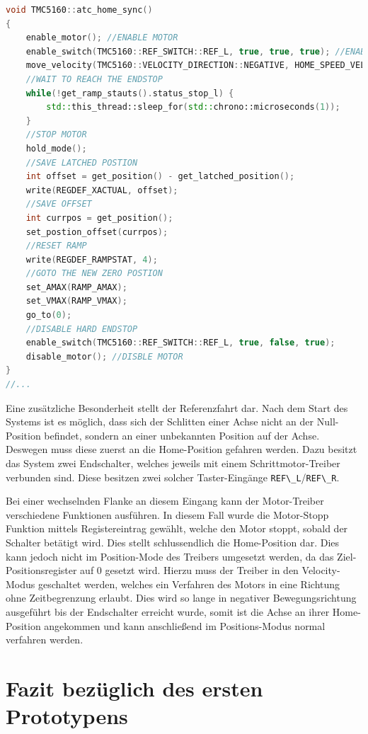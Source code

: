 \begin{lstlisting}[language={C++}]
void TMC5160::atc_home_sync()
{    
    enable_motor(); //ENABLE MOTOR
    enable_switch(TMC5160::REF_SWITCH::REF_L, true, true, true); //ENABLE LIMIT SWICHT => ENABLE HARD ENDSTOP
    move_velocity(TMC5160::VELOCITY_DIRECTION::NEGATIVE, HOME_SPEED_VELOCITY, 1000);  //MOVE NEGATIVE TO LIMIT SWITCH
    //WAIT TO REACH THE ENDSTOP
    while(!get_ramp_stauts().status_stop_l) {
        std::this_thread::sleep_for(std::chrono::microseconds(1));        
    }
    //STOP MOTOR
    hold_mode();
    //SAVE LATCHED POSTION
    int offset = get_position() - get_latched_position();
    write(REGDEF_XACTUAL, offset);
    //SAVE OFFSET
    int currpos = get_position();
    set_postion_offset(currpos);
    //RESET RAMP
    write(REGDEF_RAMPSTAT, 4);
    //GOTO THE NEW ZERO POSTION
    set_AMAX(RAMP_AMAX);
    set_VMAX(RAMP_VMAX);
    go_to(0);
    //DISABLE HARD ENDSTOP 
    enable_switch(TMC5160::REF_SWITCH::REF_L, true, false, true);
    disable_motor(); //DISBLE MOTOR
}
//...
\end{lstlisting}

Eine zusätzliche Besonderheit stellt der Referenzfahrt dar. Nach dem
Start des Systems ist es möglich, dass sich der Schlitten einer Achse
nicht an der Null-Position befindet, sondern an einer unbekannten
Position auf der Achse. Deswegen muss diese zuerst an die Home-Position
gefahren werden. Dazu besitzt das System zwei Endschalter, welches
jeweils mit einem Schrittmotor-Treiber verbunden sind. Diese besitzen
zwei solcher Taster-Eingänge
\passthrough{\lstinline!REF\_L!}/\passthrough{\lstinline!REF\_R!}.

Bei einer wechselnden Flanke an diesem Eingang kann der Motor-Treiber
verschiedene Funktionen ausführen. In diesem Fall wurde die Motor-Stopp
Funktion mittels Registereintrag gewählt, welche den Motor stoppt,
sobald der Schalter betätigt wird. Dies stellt schlussendlich die
Home-Position dar. Dies kann jedoch nicht im Position-Mode des Treibers
umgesetzt werden, da das Ziel-Positionsregister auf 0 gesetzt wird.
Hierzu muss der Treiber in den Velocity-Modus geschaltet werden, welches
ein Verfahren des Motors in eine Richtung ohne Zeitbegrenzung erlaubt.
Dies wird so lange in negativer Bewegungsrichtung ausgeführt bis der
Endschalter erreicht wurde, somit ist die Achse an ihrer Home-Position
angekommen und kann anschließend im Positions-Modus normal verfahren
werden.

\hypertarget{fazit-bezuxfcglich-des-ersten-prototypens}{%
\section{Fazit bezüglich des ersten
Prototypens}\label{fazit-bezuxfcglich-des-ersten-prototypens}}

